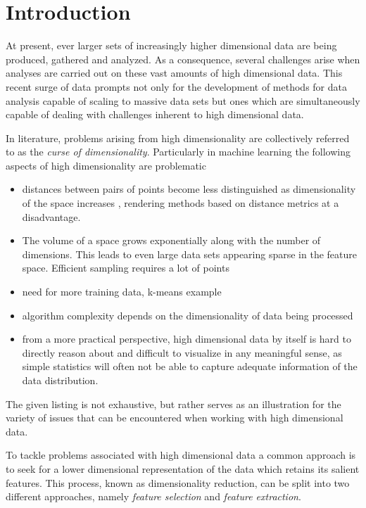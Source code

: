 \chapter{Introduction}
\label{ch:introduction}


At present, ever larger sets of increasingly higher dimensional data are being produced, gathered and analyzed. As a consequence, several challenges arise when analyses are carried out on these vast amounts of high dimensional data. This recent surge of data prompts not only for the development of methods for data analysis capable of scaling to massive data sets but ones which are simultaneously capable of dealing with challenges inherent to high dimensional data.

In literature, problems arising from high dimensionality are collectively referred to as the \textit{curse of dimensionality}. Particularly in machine learning the following aspects of high dimensionality are problematic

\begin{itemize}
\item distances between pairs of points become less distinguished as dimensionality of the space increases \cite{on_the_surprising_behavior_of_distance_metrics}, rendering methods based on distance metrics at a disadvantage.
\item The volume of a space grows exponentially along with the number of dimensions. This leads to even large data sets appearing sparse in the feature space. Efficient sampling requires a lot of points
\item need for more training data, k-means example \cite[p.~263]{understanding_machine_learning}
\item algorithm complexity depends on the dimensionality of data being processed
\item from a more practical perspective, high dimensional data by itself is hard to directly reason about and difficult to visualize in any meaningful sense, as simple statistics will often not be able to capture adequate information of the data distribution.
\end{itemize}

The given listing is not exhaustive, but rather serves as an illustration for the variety of issues that can be encountered when working with high dimensional data.

To tackle problems associated with high dimensional data a common approach is to seek for a lower dimensional representation of the data which retains its salient features. This process, known as dimensionality reduction, can be split into two different approaches, namely \textit{feature selection} and \textit{feature extraction}.

